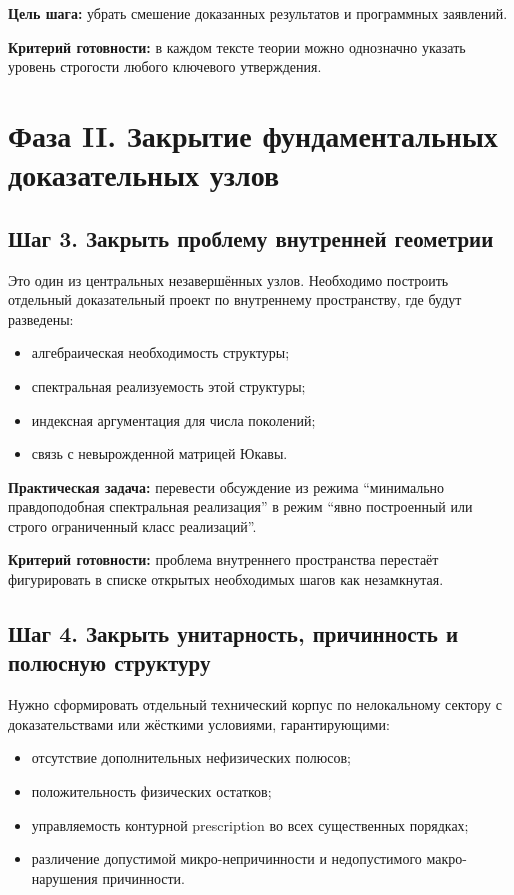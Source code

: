 \documentclass[12pt,a4paper]{article}
\begin{document}
\textbf{Цель шага:} убрать смешение доказанных результатов и программных заявлений.

\textbf{Критерий готовности:} в каждом тексте теории можно однозначно указать уровень строгости любого ключевого утверждения.

\section{Фаза II. Закрытие фундаментальных доказательных узлов}

\subsection{Шаг 3. Закрыть проблему внутренней геометрии}

Это один из центральных незавершённых узлов. Необходимо построить отдельный доказательный проект по внутреннему пространству, где будут разведены:
\begin{itemize}
    \item алгебраическая необходимость структуры;
    \item спектральная реализуемость этой структуры;
    \item индексная аргументация для числа поколений;
    \item связь с невырожденной матрицей Юкавы.
\end{itemize}

\textbf{Практическая задача:} перевести обсуждение из режима ``минимально правдоподобная спектральная реализация'' в режим ``явно построенный или строго ограниченный класс реализаций''.

\textbf{Критерий готовности:} проблема внутреннего пространства перестаёт фигурировать в списке открытых необходимых шагов как незамкнутая.

\subsection{Шаг 4. Закрыть унитарность, причинность и полюсную структуру}

Нужно сформировать отдельный технический корпус по нелокальному сектору с доказательствами или жёсткими условиями, гарантирующими:
\begin{itemize}
    \item отсутствие дополнительных нефизических полюсов;
    \item положительность физических остатков;
    \item управляемость контурной prescription во всех существенных порядках;
    \item различение допустимой микро-непричинности и недопустимого макро-нарушения причинности.
\end{itemize}
\end{document}
